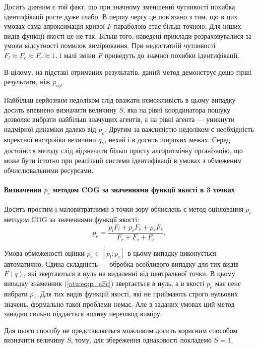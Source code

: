 Досить дивним є той факт, що при значному зменшенні чутливості похибка
ідентифікації росте дуже слабо. В першу чергу це пов'язано з тим, що в цих
умовах сама апроксимація кривої $F$ параболою стає більш точною. Для інших
видів функції якості це не так. Більш того, наведені приклади розраховувалися
за умови відсутності помилок вимірювання. При недостатній чутливості
$F_l \approx F_c \approx F_r \approx 1$, і малі зміни $F$ приведуть до значної
похибки ідентифікації.

В цілому, на підставі отриманих результатів, даний метод демонструє дещо
гірші результати, ніж $p_{eql}$.

Найбільш серйозним недоліком слід вважати неможливість в цьому
випадку досить впевнено визначити величину
$S$, яка на рівні координатора пошуку дозволяє вибрати найбільш
значущих агентів, а на рівні агента --- уникнути надмірної
динаміки далеко від
$ p_o $. Другим за важливістю недоліком є необхідність коректної
настройки величини
$ q_\gamma $, нехай і в досить широких межах. Серед достоїнств методу
слід відзначити більш просту алгоритмічну організацію, що може
бути істотно при реалізації системи ідентифікації в умовах з
обмеженим обчислювальними ресурсами.



\paragraph{Визначення $ p_e $ методом COG за значеннями функції якості в 3 точках}

Досить простим і маловитратними з точки зору обчислень є метод оцінювання $p_e$ методом
COG за значеннями функції якості:
%
\begin{equation}
  p_e =
  \frac{p_l F_l + p_c F_c + p_r F_r}{ F_r + F_c + F_r}  .
  \label{atu:eq:p_eFc}
\end{equation}

Умова обмеженості оцінки $p_e \in [p_l; p_r]$ в цьому випадку виконується
автоматично.
Єдина складність --- обробка особливого випадку для тих видів
$F(q) $, які звертаються в нуль на видаленні від центральної
точки. В цьому випадку знаменник (\ref{atu:eq:p_eFc}) звертається в нуль,
а в якості $ p_e $ має сенс вибрати $ p_c $.
Для тих видів функцій якості, які не приймають строго
нульових значень, формально такої проблеми немає.
Але в заданих умовах ций метод занадно
сильно піддається впливу перешкод виміру.

Для цього способу не представляється можливим досить корисним
способом визначити величину
$ S $, тому, для збереження однаковості покладемо
$ S = 1 $.

